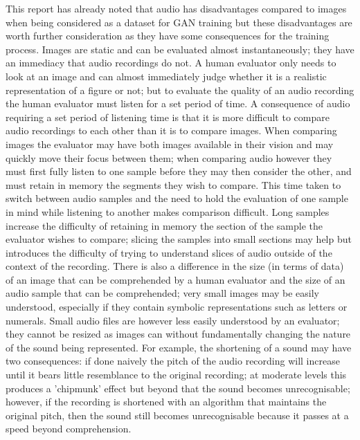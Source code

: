 \documentclass[a4paper, titlepage]{article}
\begin{document}
This report has already noted that audio has disadvantages compared to images when being considered as a dataset for \ac{GAN} training but these disadvantages are worth further consideration as they have some consequences for the training process.
\newline
\newline
Images are static and can be evaluated almost instantaneously; they have an immediacy that audio recordings do not.
A human evaluator only needs to look at an image and can almost immediately judge whether it is a realistic representation of a figure or not; but to evaluate the quality of an audio recording the human evaluator must listen for a set period of time.
\newline
\newline
A consequence of audio requiring a set period of listening time is that it is more difficult to compare audio recordings to each other than it is to compare images.
When comparing images the evaluator may have both images available in their vision and may quickly move their focus between them; when comparing audio however they must first fully listen to one sample before they may then consider the other, and must retain in memory the segments they wish to compare.
\newline
\newline
This time taken to switch between audio samples and the need to hold the evaluation of one sample in mind while listening to another makes comparison difficult.
Long samples increase the difficulty of retaining in memory the section of the sample the evaluator wishes to compare; slicing the samples into small sections may help but introduces the difficulty of trying to understand slices of audio outside of the context of the recording.
\newline
\newline
There is also a difference in the size (in terms of data) of an image that can be comprehended by a human evaluator and the size of an audio sample that can be comprehended; very small images may be easily understood, especially if they contain symbolic representations such as letters or numerals.
Small audio files are however less easily understood by an evaluator; they cannot be resized as images can without fundamentally changing the nature of the sound being represented.
\newline
\newline
For example, the shortening of a sound may have two consequences: if done naively the pitch of the audio recording will increase until it bears little resemblance to the original recording; at moderate levels this produces a 'chipmunk' effect but beyond that the sound becomes unrecognisable; however, if the recording is shortened with an algorithm that maintains the original pitch, then the sound still becomes unrecognisable because it passes at a speed beyond comprehension.
\end{document}
